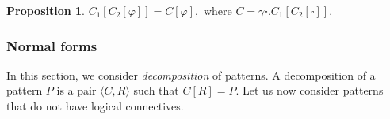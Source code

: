 \documentclass{article}
\newcounter{thmcounter}
\theoremstyle{plain}
\newtheorem{proposition}[thmcounter]{Proposition}
\theoremstyle{definition}
\theoremstyle{remark}
\begin{document}
\begin{proposition}
	$C_1[C_2[\varphi]] = C [\varphi], \text{ where } C = \gamma \square . C_1[C_2[\square]].$
\end{proposition}

\subsubsection{Normal forms}

In this section, we consider \emph{decomposition} of patterns. A decomposition of a pattern $P$ is a pair $\langle C, R \rangle $ such that $C[R] = P$. Let us now consider patterns that do not have logical connectives.

\end{document}
